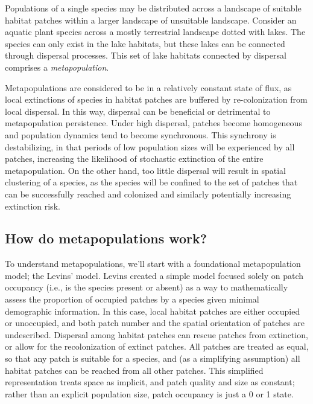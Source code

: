 \documentclass[12pt]{article}
\begin{document}
Populations of a single species may be distributed across a landscape of suitable habitat patches within a larger landscape of unsuitable landscape. Consider an aquatic plant species across a mostly terrestrial landscape dotted with lakes. The species can only exist in the lake habitats, but these lakes can be connected through dispersal processes. This set of lake habitats connected by dispersal comprises a \textit{metapopulation}. 

Metapopulations are considered to be in a relatively constant state of flux, as local extinctions of species in habitat patches are buffered by re-colonization from local dispersal. In this way, dispersal can be beneficial or detrimental to metapopulation persistence. Under high dispersal, patches become homogeneous and population dynamics tend to become synchronous. This synchrony is destabilizing, in that periods of low population sizes will be experienced by all patches, increasing the likelihood of stochastic extinction of the entire metapopulation. On the other hand, too little dispersal will result in spatial clustering of a species, as the species will be confined to the set of patches that can be successfully reached and colonized and similarly potentially increasing extinction risk.











\bigskip
\subsection*{How do metapopulations work?}
To understand metapopulations, we'll start with a foundational metapopulation model; the Levins' model. Levins created a simple model focused solely on patch occupancy (i.e., is the species present or absent) as a way to mathematically assess the proportion of occupied patches by a species given minimal demographic information. In this case, local habitat patches are either occupied or unoccupied, and both patch number and the spatial orientation of patches are undescribed. Dispersal among habitat patches can rescue patches from extinction, or allow for the recolonization of extinct patches. All patches are treated as equal, so that any patch is suitable for a species, and (as a simplifying assumption) all habitat patches can be reached from all other patches. This simplified representation treats space as implicit, and patch quality and size as constant; rather than an explicit population size, patch occupancy is just a 0 or 1 state.
\end{document}
